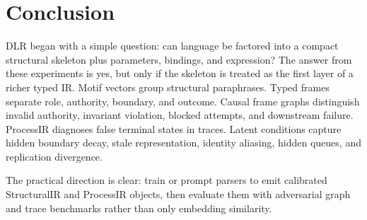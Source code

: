 \documentclass[11pt]{article}
\begin{document}
\section{Conclusion}

DLR began with a simple question: can language be factored into a compact
structural skeleton plus parameters, bindings, and expression? The answer from
these experiments is yes, but only if the skeleton is treated as the first layer
of a richer typed IR. Motif vectors group structural paraphrases. Typed frames
separate role, authority, boundary, and outcome. Causal frame graphs distinguish
invalid authority, invariant violation, blocked attempts, and downstream
failure. ProcessIR diagnoses false terminal states in traces. Latent conditions
capture hidden boundary decay, stale representation, identity aliasing, hidden
queues, and replication divergence.

The practical direction is clear: train or prompt parsers to emit calibrated
StructuralIR and ProcessIR objects, then evaluate them with adversarial graph and
trace benchmarks rather than only embedding similarity.
\end{document}
